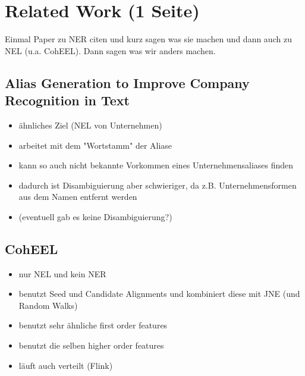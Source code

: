 \section{Related Work (1 Seite)}
Einmal Paper zu NER citen und kurz sagen was sie machen und dann auch zu NEL (u.a. CohEEL). Dann sagen was wir anders machen.


	\subsection*{Alias Generation to Improve Company Recognition in Text}
	\begin{itemize}
		\item ähnliches Ziel (NEL von Unternehmen)
		\item arbeitet mit dem "Wortstamm" der Aliase
		\item kann so auch nicht bekannte Vorkommen eines Unternehmensaliases finden
		\item dadurch ist Disambiguierung aber schwieriger, da z.B. Unternehmensformen aus dem Namen entfernt werden
		\item (eventuell gab es keine Disambiguierung?)
	\end{itemize}

	\subsection*{CohEEL}
	\begin{itemize}
		\item nur NEL und kein NER
		\item benutzt Seed und Candidate Alignments und kombiniert diese mit JNE (und Random Walks)
		\item benutzt sehr ähnliche first order features
		\item benutzt die selben higher order features
		\item läuft auch verteilt (Flink)
	\end{itemize}